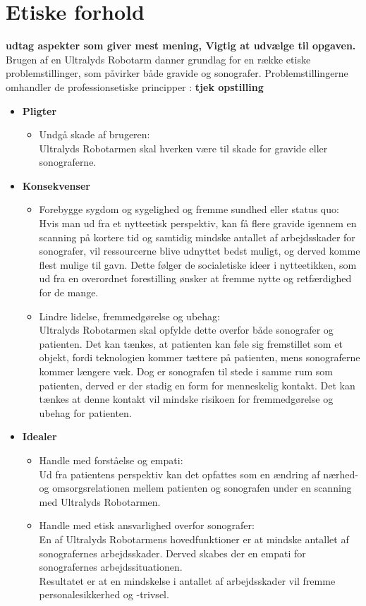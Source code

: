 \section{Etiske forhold}
\textbf{udtag aspekter som giver mest mening, Vigtig at udvælge til opgaven.}
Brugen af en Ultralyds Robotarm danner grundlag for en række etiske problemstillinger, som påvirker både gravide og sonografer. 
Problemstillingerne omhandler de professionsetiske principper \cite{Husted}: 
\textbf{tjek opstilling}
\begin{itemize}
	\item \textbf{Pligter}
	\begin{itemize}
		\item Undgå skade af brugeren:\\ 
		Ultralyds Robotarmen skal hverken være til skade for gravide eller sonograferne. 
	\end{itemize} 
	\item \textbf{Konsekvenser}
	\begin{itemize}
		\item Forebygge sygdom og sygelighed og fremme sundhed eller status quo: \\
		Hvis man ud fra et nytteetisk perspektiv, kan få flere gravide igennem en scanning på kortere tid og samtidig mindske antallet af arbejdsskader for sonografer, vil ressourcerne blive udnyttet bedst muligt, og derved komme flest mulige til gavn. Dette følger de socialetiske ideer i nytteetikken, som ud fra en overordnet forestilling ønsker at fremme nytte og retfærdighed for de mange.    
		\item Lindre lidelse, fremmedgørelse og ubehag:\\
		Ultralyds Robotarmen skal opfylde dette overfor både sonografer og patienten. Det kan tænkes, at patienten kan føle sig fremstillet som et objekt, fordi teknologien kommer tættere på patienten, mens sonograferne kommer længere væk. Dog er sonografen til stede i samme rum som patienten, derved er der stadig en form for menneskelig kontakt. Det kan tænkes at denne kontakt vil mindske risikoen for fremmedgørelse og ubehag for patienten.   
	\end{itemize}
	\item \textbf{Idealer}
	\begin{itemize}
		\item Handle med forståelse og empati:\\
		Ud fra patientens perspektiv kan det opfattes som en ændring af nærhed- og omsorgsrelationen mellem patienten og sonografen under en scanning med Ultralyds Robotarmen. 
		\item Handle med etisk ansvarlighed overfor sonografer:\\
		En af Ultralyds Robotarmens hovedfunktioner er at mindske antallet af sonografernes arbejdsskader. Derved skabes der en empati for sonografernes arbejdssituationen.\\
		Resultatet er at en mindskelse i antallet af arbejdsskader vil fremme personalesikkerhed og -trivsel.   		
	\end{itemize} 
\end{itemize} 

